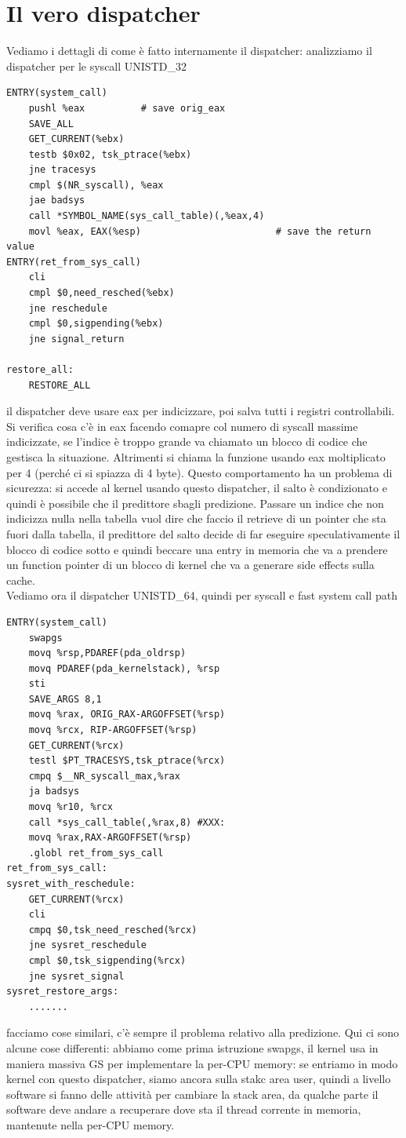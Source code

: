 \documentclass[12pt, oneside]{extbook}
\begin{document}
\section{Il vero dispatcher}
Vediamo i dettagli di come è fatto internamente il dispatcher: analizziamo il dispatcher per le syscall UNISTD\_32
\begin{lstlisting}
ENTRY(system_call)
	pushl %eax			# save orig_eax
	SAVE_ALL
	GET_CURRENT(%ebx)
	testb $0x02, tsk_ptrace(%ebx)
	jne tracesys
	cmpl $(NR_syscall), %eax
	jae badsys
	call *SYMBOL_NAME(sys_call_table)(,%eax,4)
	movl %eax, EAX(%esp)						# save the return value
ENTRY(ret_from_sys_call)
	cli
	cmpl $0,need_resched(%ebx)
	jne reschedule
	cmpl $0,sigpending(%ebx)
	jne signal_return
	
restore_all:
	RESTORE_ALL
\end{lstlisting}
il dispatcher deve usare eax per indicizzare, poi salva tutti i registri controllabili. Si verifica cosa c'è in eax facendo comapre col numero di syscall massime indicizzate, se l'indice è troppo grande va chiamato un blocco di codice che gestisca la situazione. Altrimenti si chiama la funzione usando eax moltiplicato per 4 (perché ci si spiazza di 4 byte). Questo comportamento ha un problema di sicurezza: si accede al kernel usando questo dispatcher, il salto è condizionato e quindi è possibile che il predittore sbagli predizione. Passare un indice che non indicizza nulla nella tabella vuol dire che faccio il retrieve di un pointer che sta fuori dalla tabella, il predittore del salto decide di far eseguire speculativamente il blocco di codice sotto e quindi beccare una entry in memoria che va a prendere un function pointer di un blocco di kernel che va a generare side effects sulla cache.\\ Vediamo ora il dispatcher UNISTD\_64, quindi per syscall e fast system call path
\begin{lstlisting}
ENTRY(system_call)
	swapgs
	movq %rsp,PDAREF(pda_oldrsp)
	movq PDAREF(pda_kernelstack), %rsp
	sti
	SAVE_ARGS 8,1
	movq %rax, ORIG_RAX-ARGOFFSET(%rsp)
	movq %rcx, RIP-ARGOFFSET(%rsp)
	GET_CURRENT(%rcx)
	testl $PT_TRACESYS,tsk_ptrace(%rcx)
	cmpq $__NR_syscall_max,%rax
	ja badsys
	movq %r10, %rcx
	call *sys_call_table(,%rax,8) #XXX:
	movq %rax,RAX-ARGOFFSET(%rsp)
	.globl ret_from_sys_call
ret_from_sys_call:
sysret_with_reschedule:
	GET_CURRENT(%rcx)
	cli
	cmpq $0,tsk_need_resched(%rcx)
	jne sysret_reschedule
	cmpl $0,tsk_sigpending(%rcx)
	jne sysret_signal
sysret_restore_args:
	.......
\end{lstlisting}
facciamo cose similari, c'è sempre il problema relativo alla predizione. Qui ci sono alcune cose differenti: abbiamo come prima istruzione swapgs, il kernel usa in maniera massiva GS per implementare la per-CPU memory: se entriamo in modo kernel con questo dispatcher, siamo ancora sulla stakc area user, quindi a livello software si fanno delle attività per cambiare la stack area, da qualche parte il software deve andare a recuperare dove sta il thread corrente in memoria, mantenute nella per-CPU memory.\\
\end{document}
